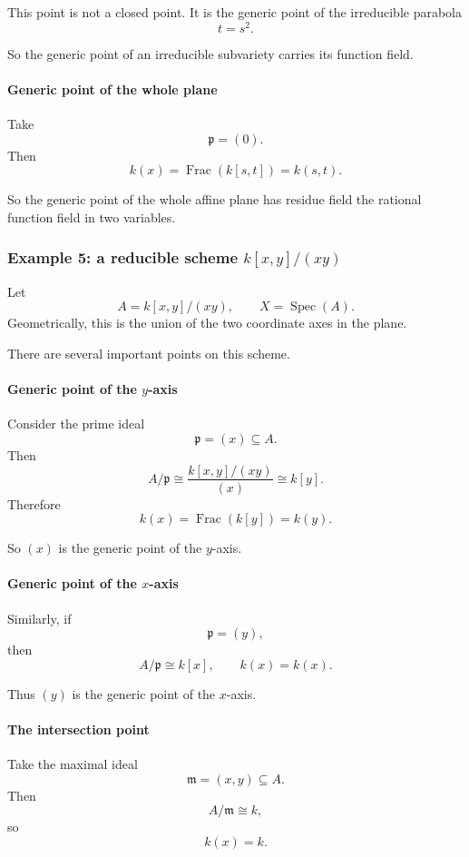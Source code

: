 \documentclass[12pt,a4paper]{article}
\theoremstyle{notespace}
\newcommand{\Spec}{\operatorname{Spec}}
\newcommand{\Frac}{\operatorname{Frac}}
\newcommand{\m}{\mathfrak m}
\newcommand{\p}{\mathfrak p}
\theoremstyle{definition}
\begin{document}
This point is not a closed point.  
It is the generic point of the irreducible parabola
\[
t=s^2.
\]

So the generic point of an irreducible subvariety carries its function field.

\paragraph{Generic point of the whole plane}

Take
\[
\p=(0).
\]
Then
\[
k(x)=\Frac(k[s,t])=k(s,t).
\]

So the generic point of the whole affine plane has residue field the rational function field in two variables.

\subsubsection{Example 5: a reducible scheme \(k[x,y]/(xy)\)}

Let
\[
A=k[x,y]/(xy),\qquad X=\Spec(A).
\]
Geometrically, this is the union of the two coordinate axes in the plane.

There are several important points on this scheme.

\paragraph{Generic point of the \(y\)-axis}

Consider the prime ideal
\[
\p=(x)\subseteq A.
\]
Then
\[
A/\p \cong \frac{k[x,y]/(xy)}{(x)} \cong k[y].
\]
Therefore
\[
k(x)=\Frac(k[y])=k(y).
\]

So \((x)\) is the generic point of the \(y\)-axis.

\paragraph{Generic point of the \(x\)-axis}

Similarly, if
\[
\p=(y),
\]
then
\[
A/\p \cong k[x],
\qquad
k(x)=k(x).
\]

Thus \((y)\) is the generic point of the \(x\)-axis.

\paragraph{The intersection point}

Take the maximal ideal
\[
\m=(x,y)\subseteq A.
\]
Then
\[
A/\m \cong k,
\]
so
\[
k(x)=k.
\]
\end{document}

